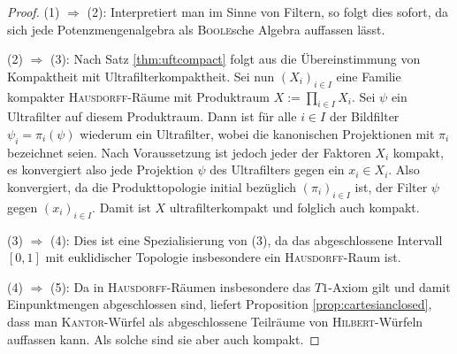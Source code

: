 \begin{proof}
  (1) $\Rightarrow$ (2): 
  Interpretiert man \PIT im Sinne von Filtern, so folgt dies sofort, da sich jede Potenzmengenalgebra als \textsc{Boole}sche Algebra auffassen lässt.

  (2) $\Rightarrow$ (3):
  Nach Satz \ref{thm:uftcompact} folgt aus \UFT die Übereinstimmung von Kompaktheit mit Ultrafilterkompaktheit.
  Sei nun $(X_i)_{i \in I}$ eine Familie kompakter \textsc{Hausdorff}-Räume mit Produktraum $X := \prod_{i \in I} X_i$.
  Sei $\psi$ ein Ultrafilter auf diesem Produktraum.
  Dann ist für alle $i \in I$ der Bildfilter $\psi_i = \pi_i(\psi)$ wiederum ein Ultrafilter, wobei die kanonischen Projektionen mit $\pi_i$ bezeichnet seien.
  Nach Voraussetzung ist jedoch jeder der Faktoren $X_i$ kompakt, es konvergiert also jede Projektion $\psi$ des Ultrafilters gegen ein $x_i \in X_i$.
  Also konvergiert, da die Produkttopologie initial bezüglich $(\pi_i)_{i \in I}$ ist, der Filter $\psi$ gegen $(x_i)_{i \in I}$.
  Damit ist $X$ ultrafilterkompakt und folglich auch kompakt.

  (3) $\Rightarrow$ (4):
  Dies ist eine Spezialisierung von (3), da das abgeschlossene Intervall $[0,1]$ mit euklidischer Topologie insbesondere ein \textsc{Hausdorff}-Raum ist.

  (4) $\Rightarrow$ (5):
  Da in \textsc{Hausdorff}-Räumen insbesondere das $T1$-Axiom gilt und damit Einpunktmengen abgeschlossen sind, liefert Proposition \ref{prop:cartesianclosed}, dass man \textsc{Kantor}-Würfel als abgeschlossene Teilräume von \textsc{Hilbert}-Würfeln auffassen kann. 
  Als solche sind sie aber auch kompakt.


\end{proof}
